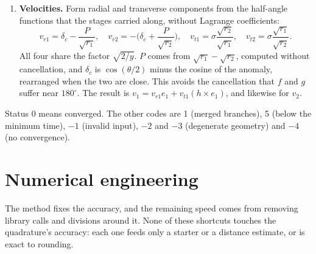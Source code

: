 \documentclass[11pt]{article}
\begin{document}
\begin{enumerate}
  \item \textbf{Velocities.} Form radial and transverse components from the half-angle functions that the stages carried along, without Lagrange coefficients:
  \[
    v_{r1} = \delta_c - \frac{P}{\sqrt{r_1}}, \quad
    v_{r2} = -\Big(\delta_c + \frac{P}{\sqrt{r_2}}\Big), \quad
    v_{t1} = \sigma\frac{\sqrt{r_2}}{\sqrt{r_1}}, \quad
    v_{t2} = \sigma\frac{\sqrt{r_1}}{\sqrt{r_2}}.
  \]
  All four share the factor $\sqrt{2/y}$. $P$ comes from $\sqrt{r_1}-\sqrt{r_2}$, computed without cancellation, and $\delta_c$ is $\cos(\theta/2)$ minus the cosine of the anomaly, rearranged when the two are close. This avoids the cancellation that $f$ and $g$ suffer near $180^\circ$. The result is $v_1 = v_{r1}e_1 + v_{t1}(h\times e_1)$, and likewise for $v_2$.
\end{enumerate}

Status 0 means converged. The other codes are 1 (merged branches), 5 (below the minimum time), $-1$ (invalid input), $-2$ and $-3$ (degenerate geometry) and $-4$ (no convergence).

\section{Numerical engineering}

The method fixes the accuracy, and the remaining speed comes from removing library calls and divisions around it. None of these shortcuts touches the quadrature's accuracy: each one feeds only a starter or a distance estimate, or is exact to rounding.
\end{document}
